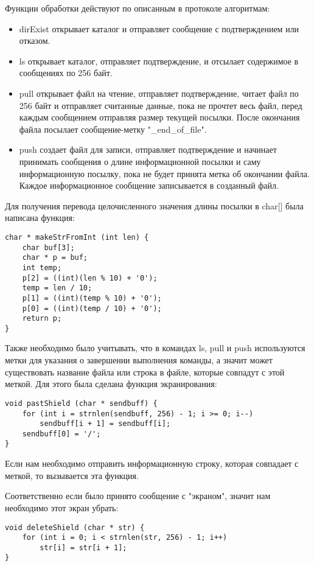 Функции обработки действуют по описанным в протоколе алгоритмам:
\begin{itemize}
\item dirExist открывает каталог и отправляет сообщение с подтверждением или отказом.
\item ls открывает каталог, отправляет подтверждение, и отсылает содержимое в сообщениях по 256 байт.
\item pull открывает файл на чтение, отправляет подтверждение, читает файл по 256 байт и отправляет считанные данные, пока не прочтет весь файл, перед каждым сообщением отправляя размер текущей посылки. После окончания файла посылает сообщение-метку "\_end\_of\_file".
\item push создает файл для записи, отправляет подтверждение и начинает принимать сообщения о длине информационной посылки и саму информационную посылку, пока не будет принята метка об окончании файла. Каждое информационное сообщение записывается в созданный файл.
\end{itemize}

Для получения перевода целочисленного значения длины посылки в char[] была написана функция:
\begin{lstlisting}
char * makeStrFromInt (int len) {
    char buf[3];
    char * p = buf;
    int temp;
    p[2] = ((int)(len % 10) + '0');
    temp = len / 10;
    p[1] = ((int)(temp % 10) + '0');
    p[0] = ((int)(temp / 10) + '0');
    return p;
}
\end{lstlisting}

Также необходимо было учитывать, что в командах ls, pull и push используются метки для указания о завершении выполнения команды, а значит может существовать название файла или строка в файле, которые совпадут с этой меткой. Для этого была сделана функция экранирования:
\begin{lstlisting}
void pastShield (char * sendbuff) {
    for (int i = strnlen(sendbuff, 256) - 1; i >= 0; i--)
        sendbuff[i + 1] = sendbuff[i];
    sendbuff[0] = '/';
}
\end{lstlisting}
Если нам необходимо отправить информационную строку, которая совпадает с меткой, то вызывается эта функция.

Соответственно если было принято сообщение с "экраном", значит нам необходимо этот экран убрать:
\begin{lstlisting}
void deleteShield (char * str) {
    for (int i = 0; i < strnlen(str, 256) - 1; i++)
        str[i] = str[i + 1];
}
\end{lstlisting}

